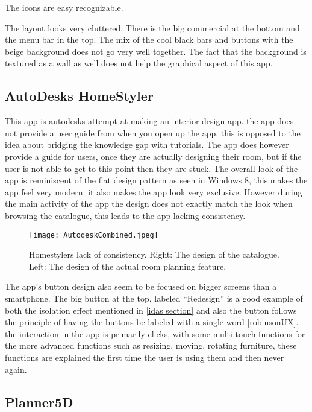 The icons are easy recognizable.  

The layout looks very cluttered. There is the big commercial at the bottom and the menu bar in the top. 
The mix of the cool black bars and buttons with the beige background does not go very well together. The fact that the background is textured as a wall as well does not help the graphical aspect of this app. 

\subsection{AutoDesks HomeStyler}
This app is autodesks attempt at making an interior design app. the app does not provide a user  guide  from when you open up the app, this is opposed to the idea about bridging the knowledge gap with tutorials. The app does 
however provide a guide for users, once they are actually designing their room, but if the user is not able to get 
to this point then they are stuck. The overall look of the app is reminiscent of the flat design pattern as seen 
in Windows 8, this makes the app feel very modern. it also makes the app look very exclusive. However during the 
main activity of the app the design does not exactly match the look when browsing the catalogue, this leads to the 
app lacking consistency. 

\begin{figure}[H]
\centering
\texttt{[image: AutodeskCombined.jpeg]}
\caption{Homestylers lack of consistency. Right: The design of the catalogue. Left: The design of the actual room planning feature.}
\end{figure}

The app’s button design also seem to be focused on bigger screens than a smartphone. The 
big button at the top, labeled “Redesign” is a good example of both the isolation effect mentioned in \ref{idas 
section} and also the button follows the principle of having the buttons be labeled with a single word 
\ref{robinsonUX}. the interaction in the app is primarily clicks, with some multi touch functions for the more 
advanced functions such as resizing, moving, rotating furniture, these functions are explained the first time the 
user is using them and then never again.

\subsection{Planner5D}


